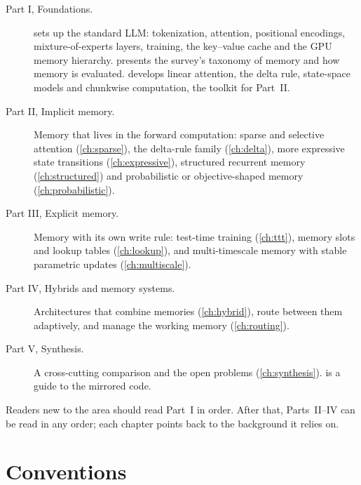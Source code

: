 \begin{description}
  \item[Part I, Foundations.]  sets up the standard LLM: tokenization,
    attention, positional encodings, mixture-of-experts layers, training, the key--value cache
    and the GPU memory hierarchy.  presents the survey's taxonomy of memory
    and how memory is evaluated.  develops linear attention, the delta rule,
    state-space models and chunkwise computation, the toolkit for Part~II.
  \item[Part II, Implicit memory.] Memory that lives in the forward computation: sparse and
    selective attention (\cref{ch:sparse}), the delta-rule family (\cref{ch:delta}), more
    expressive state transitions (\cref{ch:expressive}), structured recurrent memory
    (\cref{ch:structured}) and probabilistic or objective-shaped memory
    (\cref{ch:probabilistic}).
  \item[Part III, Explicit memory.] Memory with its own write rule: test-time training
    (\cref{ch:ttt}), memory slots and lookup tables (\cref{ch:lookup}), and multi-timescale
    memory with stable parametric updates (\cref{ch:multiscale}).
  \item[Part IV, Hybrids and memory systems.] Architectures that combine memories
    (\cref{ch:hybrid}), route between them adaptively, and manage the working memory
    (\cref{ch:routing}).
  \item[Part V, Synthesis.] A cross-cutting comparison and the open problems
    (\cref{ch:synthesis}).  is a guide to the mirrored code.
\end{description}
Readers new to the area should read Part~I in order. After that, Parts~II--IV can be read in
any order; each chapter points back to the background it relies on.

\section*{Conventions}

